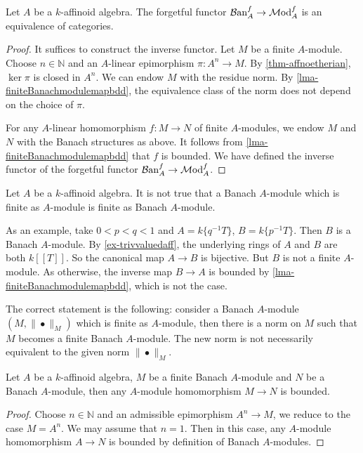\begin{proposition}\label{prop-finteBanachAmoduleequivfinitemodule}
    Let $A$ be a $k$-affinoid algebra. 
    The forgetful functor $\mathcal{B}\mathrm{an}_A^f\rightarrow \mathcal{M}\mathrm{od}_A^f$ is an equivalence of categories.
\end{proposition}

\begin{proof}
    It suffices to construct the inverse functor. Let $M$ be a finite $A$-module. Choose $n\in \mathbb{N}$ and an $A$-linear epimorphism $\pi:A^n\rightarrow M$. By \cref{thm-affnoetherian}, $\ker \pi$ is closed in $A^n$. We can endow $M$ with the residue norm. By \cref{lma-finiteBanachmodulemapbdd}, the equivalence class of the norm does not depend on the choice of $\pi$.

    For any $A$-linear homomorphism $f:M\rightarrow N$ of finite $A$-modules, we endow $M$ and $N$ with the Banach structures as above. It follows from \cref{lma-finiteBanachmodulemapbdd} that $f$ is bounded. We have defined the inverse functor of the forgetful functor  $\mathcal{B}\mathrm{an}_A^f\rightarrow \mathcal{M}\mathrm{od}_A^f$.
\end{proof}
\begin{remark}Let $A$ be a $k$-affinoid algebra. 
    It is not true that a Banach $A$-module which is finite as $A$-module is finite as Banach $A$-module. 

    As an example, take $0<p<q<1$ and $A=k\{q^{-1}T\}$, $B=k\{p^{-1}T\}$. Then $B$ is a Banach $A$-module.
    By \cref{ex-trivvaluedaff}, the underlying rings of $A$ and $B$ are both $k[[T]]$. So the canonical map $A\rightarrow B$ is bijective. But $B$ is not a finite $A$-module. As otherwise, the inverse map $B\rightarrow A$ is bounded by \cref{lma-finiteBanachmodulemapbdd}, which is not the case.

    The correct statement is the following: consider a Banach $A$-module $(M,\|\bullet\|_M)$ which is finite as $A$-module, then there is a norm on $M$ such that $M$ becomes a finite Banach $A$-module. The new norm is not necessarily equivalent to the given norm $\|\bullet\|_M$.
\end{remark}

\begin{proposition}\label{prop-admitobanachbdd}
    Let $A$ be a $k$-affinoid algebra, $M$ be a finite Banach $A$-module and $N$ be a Banach $A$-module, then any $A$-module homomorphism $M\rightarrow N$ is bounded.
\end{proposition}
\begin{proof}
    Choose $n\in \mathbb{N}$ and an admissible epimorphism $A^n\rightarrow M$, we reduce to the case $M=A^n$. We may assume that $n=1$. Then in this case, any $A$-module homomorphism $A\rightarrow N$ is bounded by definition of Banach $A$-modules.
\end{proof}



